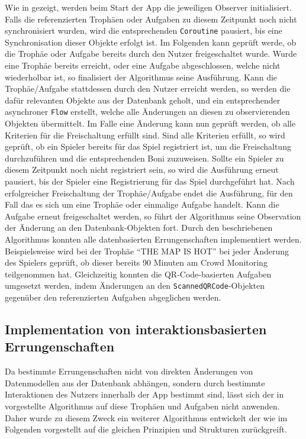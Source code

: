 Wie in  gezeigt, werden beim Start der App die jeweiligen Observer initialisiert. Falls die referenzierten Trophäen oder Aufgaben zu diesem Zeitpunkt noch nicht synchronisiert wurden, wird die entsprechenden \texttt{Coroutine} pausiert, bis eine Synchronisation dieser Objekte erfolgt ist. Im Folgenden kann geprüft werde, ob die Trophäe oder Aufgabe bereits durch den Nutzer freigeschaltet wurde. Wurde eine Trophäe bereits erreicht, oder eine Aufgabe abgeschlossen, welche nicht wiederholbar ist, so finalisiert der Algorithmus seine Ausführung. Kann die Trophäe/Aufgabe stattdessen durch den Nutzer erreicht werden, so werden die dafür relevanten Objekte aus der Datenbank geholt, und ein entsprechender asynchroner \texttt{Flow} erstellt, welche alle Änderungen an diesen zu observierenden Objekten übermittelt. Im Falle eine Änderung kann nun geprüft werden, ob alle Kriterien für die Freischaltung erfüllt sind. Sind alle Kriterien erfüllt, so wird geprüft, ob ein Spieler bereits für das Spiel registriert ist, um die Freischaltung durchzuführen und die entsprechenden Boni zuzuweisen. Sollte ein Spieler zu diesem Zeitpunkt noch nicht registriert sein, so wird die Ausführung erneut pausiert, bis der Spieler eine Registrierung für das Spiel durchgeführt hat. Nach erfolgreicher Freischaltung der Trophäe/Aufgabe endet die Ausführung, für den Fall das es sich um eine Trophäe oder einmalige Aufgabe handelt. Kann die Aufgabe erneut freigeschaltet werden, so führt der Algorithmus seine Observation der Änderung an den Datenbank-Objekten fort. \newline Durch den beschriebenen Algorithmus konnten alle datenbasierten Errungenschaften implementiert werden. Beispielsweise wird bei der Trophäe \enquote{THE MAP IS HOT} bei jeder Änderung des Spielers geprüft, ob dieser bereits 90 Minuten am Crowd Monitoring teilgenommen hat. Gleichzeitig konnten die QR-Code-basierten Aufgaben umgesetzt werden, indem Änderungen an den \texttt{ScannedQRCode}-Objekten gegenüber den referenzierten Aufgaben abgeglichen werden.

\subsection{Implementation von interaktionsbasierten Errungenschaften}

Da bestimmte Errungenschaften nicht von direkten Änderungen von Datenmodellen aus der Datenbank abhängen, sondern durch bestimmte Interaktionen des Nutzers innerhalb der App bestimmt sind, lässt sich der in  vorgestellte Algorithmus auf diese Trophäen und Aufgaben nicht anwenden. Daher wurde zu diesem Zweck ein weiterer Algorithmus entwickelt der wie im Folgenden vorgestellt auf die gleichen Prinzipien und Strukturen zurückgreift.

